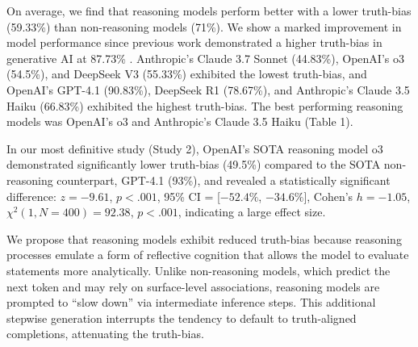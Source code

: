 \documentclass{article}
\begin{document}
On average, we find that reasoning models perform better with a lower truth-bias (59.33\%) than non-reasoning models (71\%). We show a marked improvement in model performance since previous work demonstrated a higher truth-bias in generative AI at 87.73\% \citep{markowitz_generative_2024}. Anthropic's Claude 3.7 Sonnet (44.83\%), OpenAI's o3 (54.5\%), and DeepSeek V3 (55.33\%) exhibited the lowest truth-bias, and OpenAI's GPT-4.1 (90.83\%), DeepSeek R1 (78.67\%), and Anthropic's Claude 3.5 Haiku (66.83\%) exhibited the highest truth-bias. The best performing reasoning models was OpenAI's o3 and Anthropic's Claude 3.5 Haiku (Table 1).

In our most definitive study (Study 2), OpenAI's SOTA reasoning model o3 demonstrated significantly lower truth-bias (49.5\%) compared to the SOTA non-reasoning counterpart, GPT-4.1 (93\%), and revealed a statistically significant difference: $z = -9.61$, $p < .001$, 95\% CI = [$-52.4\%$, $-34.6\%$], Cohen’s $h = -1.05$, $\chi^2(1, N = 400) = 92.38$, $p < .001$, indicating a large effect size.

We propose that reasoning models exhibit reduced truth-bias because reasoning processes emulate a form of reflective cognition that allows the model to evaluate statements more analytically. Unlike non-reasoning models, which predict the next token and may rely on surface-level associations, reasoning models are prompted to ``slow down'' via intermediate inference steps. This additional stepwise generation interrupts the tendency to default to truth-aligned completions, attenuating the truth-bias.
\end{document}
